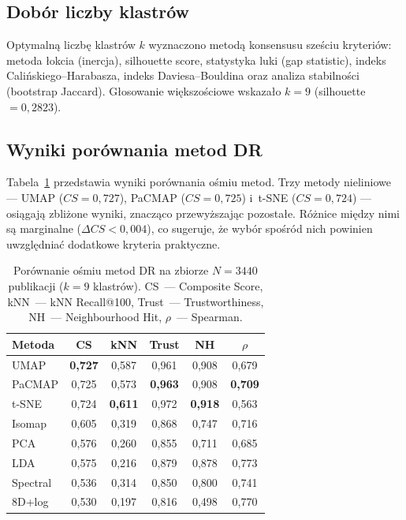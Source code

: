 \documentclass[a4paper,11pt,twocolumn]{article}
\begin{document}
\subsection{Dobór liczby klastrów}

Optymalną liczbę klastrów $k$ wyznaczono metodą konsensusu sześciu
kryteriów: metoda łokcia (inercja), silhouette score, statystyka
luki (gap statistic), indeks Calińskiego--Harabasza, indeks
Daviesa--Bouldina oraz analiza stabilności (bootstrap Jaccard).
Głosowanie większościowe wskazało $k=9$ (silhouette $=0{,}2823$).


\subsection{Wyniki porównania metod DR}

Tabela~\ref{tab:dr} przedstawia wyniki porównania ośmiu metod.
Trzy metody nieliniowe --- UMAP ($CS=0{,}727$), PaCMAP ($CS=0{,}725$)
i~t-SNE ($CS=0{,}724$) --- osiągają zbliżone wyniki, znacząco
przewyższając pozostałe. Różnice między nimi są marginalne
($\Delta CS < 0{,}004$), co sugeruje, że wybór spośród nich powinien
uwzględniać dodatkowe kryteria praktyczne.

\begin{table}[t]
\centering
\caption{Porównanie ośmiu metod DR na zbiorze $N=3440$ publikacji
($k=9$ klastrów). CS~--- Composite Score,
kNN~--- kNN Recall@100, Trust~--- Trustworthiness,
NH~--- Neighbourhood Hit, $\rho$~--- Spearman.}
\label{tab:dr}
\small
\setlength{\tabcolsep}{3pt}
\begin{tabular}{@{}lccccc@{}}
\toprule
Metoda & CS & kNN & Trust & NH & $\rho$ \\
\midrule
UMAP      & \textbf{0,727} & 0,587 & 0,961 & 0,908 & 0,679 \\
PaCMAP    & 0,725 & 0,573 & \textbf{0,963} & 0,908 & \textbf{0,709} \\
t-SNE     & 0,724 & \textbf{0,611} & 0,972 & \textbf{0,918} & 0,563 \\
Isomap    & 0,605 & 0,319 & 0,868 & 0,747 & 0,716 \\
PCA       & 0,576 & 0,260 & 0,855 & 0,711 & 0,685 \\
LDA       & 0,575 & 0,216 & 0,879 & 0,878 & 0,773 \\
Spectral  & 0,536 & 0,314 & 0,850 & 0,800 & 0,741 \\
8D+log    & 0,530 & 0,197 & 0,816 & 0,498 & 0,770 \\
\bottomrule
\end{tabular}
\end{table}
\end{document}
